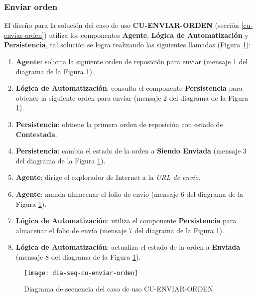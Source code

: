 \subsubsection{Enviar orden}
El diseño para la solución del caso de uso \textbf{CU-ENVIAR-ORDEN} (sección \ref{cu-enviar-orden}) utiliza los componentes \textbf{Agente}, \textbf{Lógica de Automatización} y \textbf{Persistencia}, tal solución se logra realizando las siguientes llamadas (Figura \ref{fig:dia-seq-cu-enviar-orden}):
\begin{enumerate}
	\item \textbf{Agente}: solicita la siguiente orden de reposición para enviar (mensaje 1 del diagrama de la Figura \ref{fig:dia-seq-cu-enviar-orden}).
	\item \textbf{Lógica de Automatización}: consulta el componente \textbf{Persistencia} para obtener la siguiente orden para enviar (mensaje 2 del diagrama de la Figura \ref{fig:dia-seq-cu-enviar-orden}).
	\item \textbf{Persistencia}: obtiene la primera orden de reposición con estado de \textbf{Contestada}.
	\item \textbf{Persistencia}: cambia el estado de la orden a \textbf{Siendo Enviada} (mensaje 3 del diagrama de la Figura \ref{fig:dia-seq-cu-enviar-orden}).
	\item \textbf{Agente}: dirige el explorador de Internet a la \textit{URL de envío}.
	\item \textbf{Agente}: manda almacenar el folio de envío (mensaje 6 del diagrama de la Figura \ref{fig:dia-seq-cu-enviar-orden}).
	\item \textbf{Lógica de Automatización}: utiliza el componente \textbf{Persistencia} para almacenar el folio de envío (mensaje 7 del diagrama de la Figura \ref{fig:dia-seq-cu-enviar-orden}).
	\item \textbf{Lógica de Automatización}: actualiza el estado de la orden a \textbf{Enviada} (mensaje 8 del diagrama de la Figura \ref{fig:dia-seq-cu-enviar-orden}).
\end{enumerate}

\begin{figure}[h]
	\centering
	\texttt{[image: dia-seq-cu-enviar-orden]}
	\caption{Diagrama de secuencia del caso de uso CU-ENVIAR-ORDEN.}
	\label{fig:dia-seq-cu-enviar-orden}
\end{figure}

